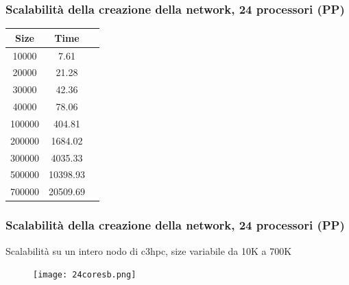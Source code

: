 \documentclass{beamer}
\begin{document}
\begin{frame}
 \frametitle{Scalabilità della creazione della network, 24 processori (PP)}
 \begin{center}
\begin{tabular}{|| c | c | c ||}
\hline
Size & Time \\ 
\hline
10000 & 7.61 \\
\hline
20000 & 21.28 \\
\hline
30000 & 42.36 \\
\hline
40000 & 78.06 \\
\hline
100000 & 404.81 \\
\hline
200000 & 1684.02 \\
\hline
300000 & 4035.33 \\
\hline
500000 & 10398.93 \\
\hline
700000 & 20509.69 \\
\hline
\end{tabular}
\end{center}
\end{frame}
\begin{frame}
 \frametitle{Scalabilità della creazione della network, 24 processori (PP)}
 Scalabilità su un intero nodo di c3hpc, size variabile da 10K a 700K
  \begin{figure}[htbp]
\centering
\texttt{[image: 24coresb.png]}

\end{figure}
\end{frame}
\end{document}
